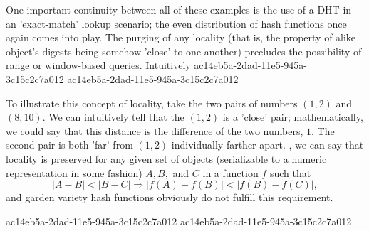 \documentclass[12pt]{article}
\begin{document}
\par One important continuity between all of these examples is the use of a DHT in an 'exact-match' lookup scenario; the even distribution of hash functions once again comes into play. The purging of any locality (that is, the property of alike object's digests being somehow 'close' to one another) precludes the possibility of range or window-based queries. Intuitively
ac14eb5a-2dad-11e5-945a-3c15c2c7a012
ac14eb5a-2dad-11e5-945a-3c15c2c7a012\par To illustrate this concept of locality, take the two pairs of numbers $(1,2)$ and $(8,10)$. We can intuitively tell that the $(1,2)$ is a 'close' pair; mathematically, we could say that this distance is the difference of the two numbers, $1$. The second pair is both 'far' from $(1,2)$ individually farther apart. , we can say that locality is preserved for any given set of objects (serializable to a numeric representation in some fashion) $A,B,$ and $C$ in a function $f$ such that
\begin{equation}
|A-B| < |B-C| \Rightarrow |f(A)-f(B)| < |f(B) - f(C)|,
\end{equation}
and garden variety hash functions obviously do not fulfill this requirement.

ac14eb5a-2dad-11e5-945a-3c15c2c7a012\printbibliography
ac14eb5a-2dad-11e5-945a-3c15c2c7a012
\end{document}
